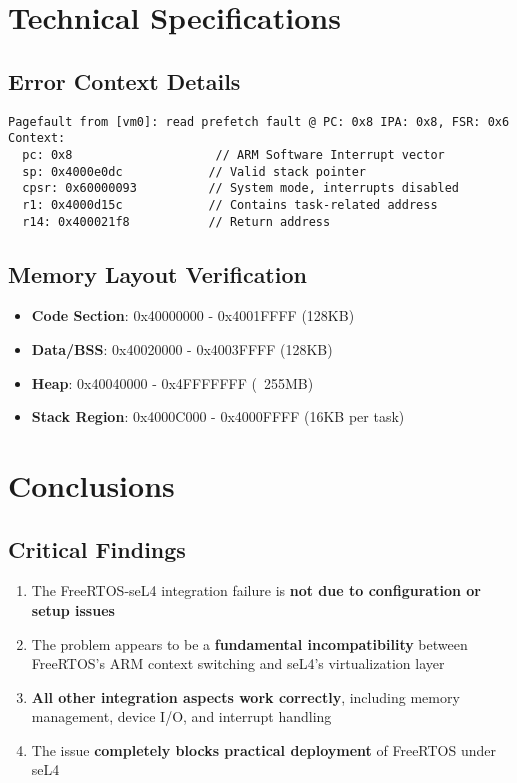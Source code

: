 \documentclass[11pt]{article}
\begin{document}
\section{Technical Specifications}

\subsection{Error Context Details}
\begin{lstlisting}[caption=Page Fault Context Dump]
Pagefault from [vm0]: read prefetch fault @ PC: 0x8 IPA: 0x8, FSR: 0x6
Context:
  pc: 0x8                    // ARM Software Interrupt vector
  sp: 0x4000e0dc            // Valid stack pointer
  cpsr: 0x60000093          // System mode, interrupts disabled
  r1: 0x4000d15c            // Contains task-related address
  r14: 0x400021f8           // Return address
\end{lstlisting}

\subsection{Memory Layout Verification}
\begin{itemize}
    \item \textbf{Code Section}: 0x40000000 - 0x4001FFFF (128KB)
    \item \textbf{Data/BSS}: 0x40020000 - 0x4003FFFF (128KB)  
    \item \textbf{Heap}: 0x40040000 - 0x4FFFFFFF (~255MB)
    \item \textbf{Stack Region}: 0x4000C000 - 0x4000FFFF (16KB per task)
\end{itemize}

\section{Conclusions}

\subsection{Critical Findings}
\begin{enumerate}
    \item The FreeRTOS-seL4 integration failure is \textbf{not due to configuration or setup issues}
    \item The problem appears to be a \textbf{fundamental incompatibility} between FreeRTOS's ARM context switching and seL4's virtualization layer
    \item \textbf{All other integration aspects work correctly}, including memory management, device I/O, and interrupt handling
    \item The issue \textbf{completely blocks practical deployment} of FreeRTOS under seL4
\end{enumerate}
\end{document}
